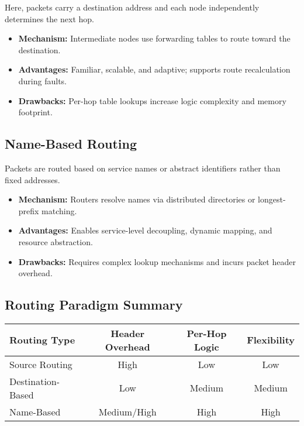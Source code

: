 \documentclass[../OAE-SPEC-MAIN.tex]{subfiles}
\begin{document}
Here, packets carry a destination address and each node independently determines the next hop.

\begin{itemize}
\item \textbf{Mechanism:} Intermediate nodes use forwarding tables to route toward the destination.
\item \textbf{Advantages:} Familiar, scalable, and adaptive; supports route recalculation during faults.
\item \textbf{Drawbacks:} Per-hop table lookups increase logic complexity and memory footprint.
\end{itemize}

\subsection{Name-Based Routing}

Packets are routed based on service names or abstract identifiers rather than fixed addresses.

\begin{itemize}
\item \textbf{Mechanism:} Routers resolve names via distributed directories or longest-prefix matching.
\item \textbf{Advantages:} Enables service-level decoupling, dynamic mapping, and resource abstraction.
\item \textbf{Drawbacks:} Requires complex lookup mechanisms and incurs packet header overhead.
\end{itemize}

\subsection{Routing Paradigm Summary}

\begin{center}
\begin{tabular}{lccc}
\toprule
\textbf{Routing Type} & \textbf{Header Overhead} & \textbf{Per-Hop Logic} & \textbf{Flexibility} \\
\midrule
Source Routing        & High                    & Low                & Low         \\
Destination-Based     & Low                     & Medium             & Medium      \\
Name-Based            & Medium/High             & High               & High        \\
\bottomrule
\end{tabular}
\end{center}
\end{document}

